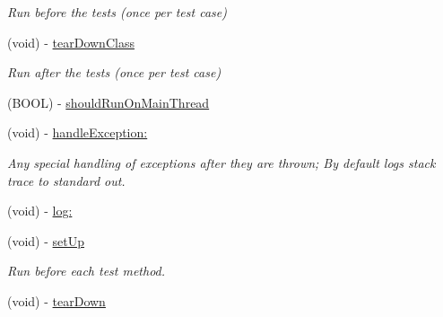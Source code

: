 \begin{DoxyCompactItemize}
\begin{DoxyCompactList}\small\item\em \-Run before the tests (once per test case) \end{DoxyCompactList}\item 
\hypertarget{interface_g_h_test_case_aa34a28629d36d3ce176b12f4a106dbbd}{
(void) -\/ \hyperlink{interface_g_h_test_case_aa34a28629d36d3ce176b12f4a106dbbd}{tear\-Down\-Class}}
\label{interface_g_h_test_case_aa34a28629d36d3ce176b12f4a106dbbd}

\begin{DoxyCompactList}\small\item\em \-Run after the tests (once per test case) \end{DoxyCompactList}\item 
(\-B\-O\-O\-L) -\/ \hyperlink{interface_g_h_test_case_a08b9bcb2d874b7785918457257446066}{should\-Run\-On\-Main\-Thread}
\item 
\hypertarget{interface_g_h_test_case_a2d3628a89e080f97c76e2d4cb08acce0}{
(void) -\/ \hyperlink{interface_g_h_test_case_a2d3628a89e080f97c76e2d4cb08acce0}{handle\-Exception\-:}}
\label{interface_g_h_test_case_a2d3628a89e080f97c76e2d4cb08acce0}

\begin{DoxyCompactList}\small\item\em \-Any special handling of exceptions after they are thrown; \-By default logs stack trace to standard out. \end{DoxyCompactList}\item 
(void) -\/ \hyperlink{interface_g_h_test_case_a432eee57d9d2fd6cf5fc47c5aac123bc}{log\-:}
\item 
\hypertarget{interface_g_h_test_case_a7982fb6211eca346bd2477ae15d2b6d8}{
(void) -\/ \hyperlink{interface_g_h_test_case_a7982fb6211eca346bd2477ae15d2b6d8}{set\-Up}}
\label{interface_g_h_test_case_a7982fb6211eca346bd2477ae15d2b6d8}

\begin{DoxyCompactList}\small\item\em \-Run before each test method. \end{DoxyCompactList}\item 
\hypertarget{interface_g_h_test_case_ad800bebf23948e860bc4e3699708dd30}{
(void) -\/ \hyperlink{interface_g_h_test_case_ad800bebf23948e860bc4e3699708dd30}{tear\-Down}}
\label{interface_g_h_test_case_ad800bebf23948e860bc4e3699708dd30}


\end{DoxyCompactItemize}

